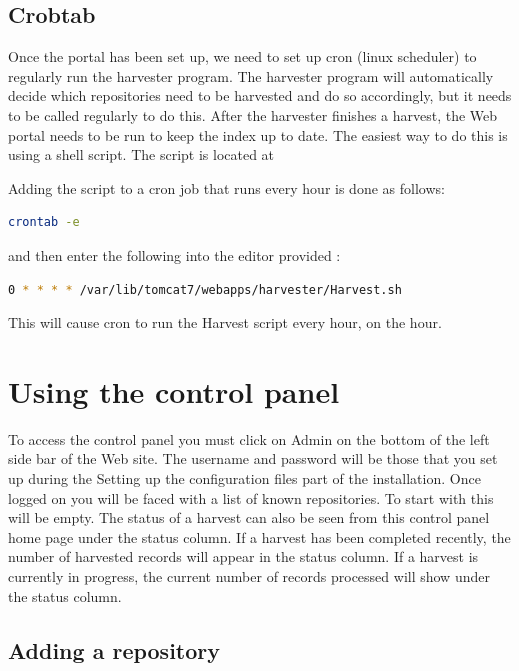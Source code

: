 \documentclass[a4paper,11pt]{article}
\begin{document}
\subsection{Crobtab}

Once the portal has been set up, we need to set up cron (linux scheduler) to regularly run the harvester program. The harvester program will automatically decide which repositories need to be harvested and do so accordingly, but it needs to be called regularly to do this. After the harvester finishes a harvest, the Web portal needs to be run to keep the index up to date. The easiest way to do this is using a shell script. The script is located at 

Adding the script to a cron job that runs every hour is done as follows: 

\begin{lstlisting}[language=bash]
 crontab -e
\end{lstlisting}

and then enter the following into the editor provided : 

\begin{lstlisting}[language=bash]
 0 * * * * /var/lib/tomcat7/webapps/harvester/Harvest.sh
\end{lstlisting}

This will cause cron to run the Harvest script every hour, on the hour.

\section{Using the control panel}

To access the control panel you must click on Admin on the bottom of the left side bar of the Web site. The username and password will be those that you set up during the Setting up the configuration files part of the installation. Once logged on you will be faced with a list of known repositories. To start with this will be empty. The status of a harvest can also be seen from this control panel home page under the status column. If a harvest has been completed recently, the number of harvested records will appear in the status column. If a harvest is currently in progress, the current number of records processed will show under the status column.

\subsection{Adding a repository}
\end{document}
